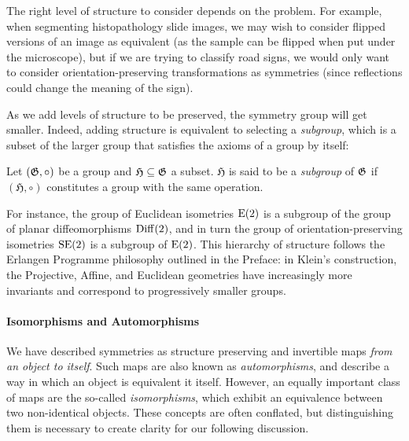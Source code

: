 The right level of structure to consider depends on the problem.
For example, when segmenting histopathology slide images, we may wish to consider flipped versions of an image as equivalent (as the sample can be flipped when put under the microscope), but if we are trying to classify road signs, we would only want to consider orientation-preserving transformations as symmetries (since reflections could change the meaning of the sign).

As we add levels of structure to be preserved, the symmetry group will get smaller.
Indeed, adding structure is equivalent to selecting a \emph{subgroup}, which is a subset of the larger group that satisfies the axioms of a group by itself:  
 
 \begin{tcolorbox}[width=\linewidth,
                   boxsep=0pt,
                   left=7.5pt,
                   right=7.5pt,
                   top=7.5pt,
                   bottom=7.5pt,
                   arc=0pt,
                   boxrule=0pt,toprule=0pt,
                   colback=boxgray,
                   ]%
 Let $({\mathfrak{G}},\circ)$ be a group and $\mathfrak{H} \subseteq {\mathfrak{G}}$ a subset. $\mathfrak{H}$ is said to be a {\em subgroup} of ${\mathfrak{G}}$ if $(\mathfrak{H},\circ)$ constitutes a group with the same operation. 
 \end{tcolorbox}
 
For instance, the group of Euclidean isometries $\operatorname{E}(2)$ is a subgroup of the group of planar diffeomorphisms $\operatorname{Diff}(2)$, and in turn the group of orientation-preserving isometries $\operatorname{SE}(2)$ is a subgroup of $\operatorname{E}(2)$.
This hierarchy of structure follows the Erlangen Programme philosophy outlined in the Preface: in Klein's construction, the Projective, Affine, and Euclidean geometries have increasingly more invariants and correspond to progressively smaller groups. 


\paragraph{Isomorphisms and Automorphisms}

We have described symmetries as structure preserving and invertible maps \emph{from an object to itself}.
Such maps are also known as \emph{automorphisms}, and describe a way in which an object is equivalent it itself.
However, an equally important class of maps are the so-called \emph{isomorphisms}, which exhibit an equivalence between two non-identical objects.
These concepts are often conflated, but distinguishing them is necessary to create  clarity for our following discussion.

